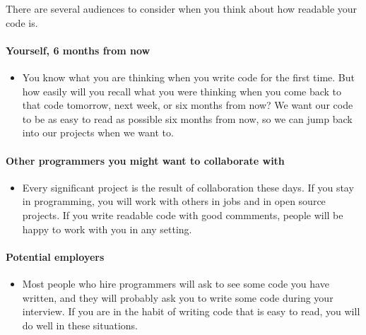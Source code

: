 \documentclass[11pt]{article}
\providecommand{\tightlist}{%
      \setlength{\itemsep}{0pt}\setlength{\parskip}{0pt}}
\begin{document}
There are several audiences to consider when you think about how
readable your code is.

\hypertarget{yourself-6-months-from-now}{%
\paragraph{Yourself, 6 months from
now}\label{yourself-6-months-from-now}}

\begin{itemize}
\tightlist
\item
  You know what you are thinking when you write code for the first time.
  But how easily will you recall what you were thinking when you come
  back to that code tomorrow, next week, or six months from now? We want
  our code to be as easy to read as possible six months from now, so we
  can jump back into our projects when we want to.
\end{itemize}

\hypertarget{other-programmers-you-might-want-to-collaborate-with}{%
\paragraph{Other programmers you might want to collaborate
with}\label{other-programmers-you-might-want-to-collaborate-with}}

\begin{itemize}
\tightlist
\item
  Every significant project is the result of collaboration these days.
  If you stay in programming, you will work with others in jobs and in
  open source projects. If you write readable code with good commments,
  people will be happy to work with you in any setting.
\end{itemize}

\hypertarget{potential-employers}{%
\paragraph{Potential employers}\label{potential-employers}}

\begin{itemize}
\tightlist
\item
  Most people who hire programmers will ask to see some code you have
  written, and they will probably ask you to write some code during your
  interview. If you are in the habit of writing code that is easy to
  read, you will do well in these situations.
\end{itemize}
\end{document}
